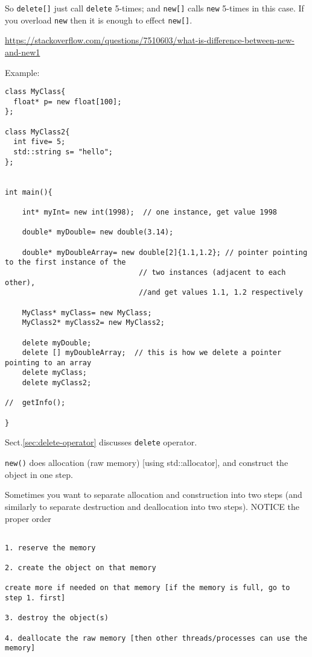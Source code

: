 So \verb!delete[]! just call \verb!delete! 5-times; and \verb!new[]! calls
\verb!new! 5-times in this case.
If you overload \verb!new! then it is enough to effect \verb!new[]!.

\url{https://stackoverflow.com/questions/7510603/what-is-difference-between-new-and-new1}


Example:
\begin{lstlisting}
class MyClass{
  float* p= new float[100];
};

class MyClass2{
  int five= 5;
  std::string s= "hello";
};


int main(){
    
    int* myInt= new int(1998);  // one instance, get value 1998
    
    double* myDouble= new double(3.14);
    
    double* myDoubleArray= new double[2]{1.1,1.2}; // pointer pointing to the first instance of the
                               // two instances (adjacent to each other),
                               //and get values 1.1, 1.2 respectively
    
    MyClass* myClass= new MyClass;  
    MyClass2* myClass2= new MyClass2;
    
    delete myDouble;
    delete [] myDoubleArray;  // this is how we delete a pointer pointing to an array
    delete myClass;
    delete myClass2;
    
//  getInfo();
    
}
\end{lstlisting}
Sect.\ref{sec:delete-operator} discusses \verb!delete! operator.

\verb!new()! does allocation (raw memory) [using std::allocator], and construct
the object in one step.

Sometimes you want to separate allocation and construction into two steps (and
similarly to separate destruction and deallocation into two steps). NOTICE the
proper order
\begin{verbatim}

1. reserve the memory

2. create the object on that memory

create more if needed on that memory [if the memory is full, go to step 1. first]

3. destroy the object(s)

4. deallocate the raw memory [then other threads/processes can use the memory]

\end{verbatim}

